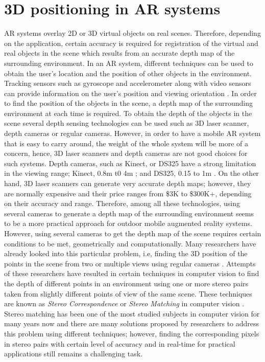\section{3D positioning in AR systems}
AR systems overlay 2D or 3D virtual objects on real scenes. Therefore, depending on the application, certain accuracy is required for 
registration of the virtual and real objects in the scene which results from an accurate depth map of the surrounding environment.
In an AR system, different techniques can be used to 
obtain the user's location and the position of other objects in the environment.
Tracking sensors such as gyroscope and accelerometer along with video sensors can provide information on the user's position and viewing orientation \cite{azum01}.
In order to find the position of the objects in the scene, a depth map of the surrounding environment at each time is required. To obtain the depth of the 
objects in the scene several depth sensing technologies can be used such as 3D laser scanner, depth cameras or regular cameras. However, in order to have a mobile AR
system that is easy to carry around, the weight of the whole system will be more of a concern, hence, 
3D laser scanners and depth cameras are not good choices for such systems.
Depth cameras, such as Kinect, or DS325 have a strong limitation in the viewing range; Kinect, 0.8m t0 4m \cite{mkinect}; and DS325, 0.15 to 1m \cite{skinetic}. 
On the other hand, 3D laser scanners can
generate very accurate depth maps; however, they are normally expensive and their price ranges from \$3K to \$300K+, 
depending on their accuracy and range.
Therefore, among all these technologies, using several 
cameras to generate a depth map of the surrounding environment seems to be a more practical approach for outdoor mobile augmented reality systems. {\newline}
However, using several cameras to get the depth map of the scene requires certain conditions to be met, geometrically and computationally. Many researchers have already looked into
this particular problem, i.e, finding the 3D position of the points in the scene from two or multiple views using regular cameras \cite{sze11}. Attempts of these researchers have resulted in
certain techniques in computer vision to find the depth of different points in an environment using one or more stereo pairs taken from slightly different points of view of the same scene.
These techniques are known as {\it Stereo Correspondence} or {\it Stereo Matching} in computer vision \cite{sze11}. Stereo matching has been one of the most studied subjects in computer vision for 
many years now and there are many solutions proposed by researchers to address this problem using different techniques; however, finding the corresponding pixels in stereo pairs with certain level of 
accuracy and in real-time for practical applications still remains a challenging task. {\newline}

